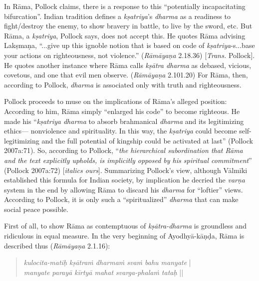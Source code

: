 In Rāma, Pollock claims, there is a response to this “potentially incapacitating bifurcation”. Indian tradition defines a \hbox{{\sl kṣatriya}’s} {\sl dharma} as a readiness to fight/destroy the enemy, to show bravery in battle, to live by the sword, etc. But Rāma, a {\sl kṣatriya}, Pollock says, does not accept this. He quotes Rāma advising Lakṣmaṇa, “...give up this ignoble notion that is based on code of {\sl kṣatriya}-s...base your actions on righteousness, not violence.” ({\sl Rāmāyaṇa} 2.18.36) [{\sl Trans.} Pollock]. He quotes another instance where Rāma calls {\sl kṣātra dharma} as debased, vicious, covetous, and one that evil men observe. ({\sl Rāmāyaṇa} 2.101.20) For Rāma, then, according to Pollock, {\sl dharma} is associated only with truth and righteousness.

Pollock proceeds to muse on the implications of Rāma’s alleged position: According to him, Rāma simply “enlarged his code” to become righteous. He made his “{\sl kṣatriya dharma} to absorb brahmanical {\sl dharma} and its legitimizing ethics--- nonviolence and spirituality. In this way, the {\sl kṣatriya} could become self-legitimizing and the full potential of kingship could be activated at last” (Pollock 2007a:71). So, according to Pollock, “{\sl the hierarchical subordination that Rāma and the text explicitly upholds, is implicitly opposed by his spiritual commitment}” (Pollock 2007a:72) [{\sl italics ours}]. Summarizing Pollock's view, although Vālmīki established this formula for Indian society, by implication he decried the {\sl varṇa} system in the end by allowing Rāma to discard his {\sl dharma} for “loftier” views. According to Pollock, it is only such a “spiritualized” {\sl dharma} that can make social peace possible.

First of all, to show Rāma as contemptuous of {\sl kṣātra-dharma} is groundless and ridiculous in equal measure. In the very beginning of Ayodhyā-kāṇḍa, Rāma is described thus ({\sl Rāmāyaṇa} 2.1.16):
\begin{quote}
{{\sl kulocita-matiḥ kṣātraṁ dharmaṁ svaṁ bahu manyate}} |\\
{\sl manyate parayā kīrtyā mahat svarga-phalaṁ tataḥ} ||  
\end{quote}


